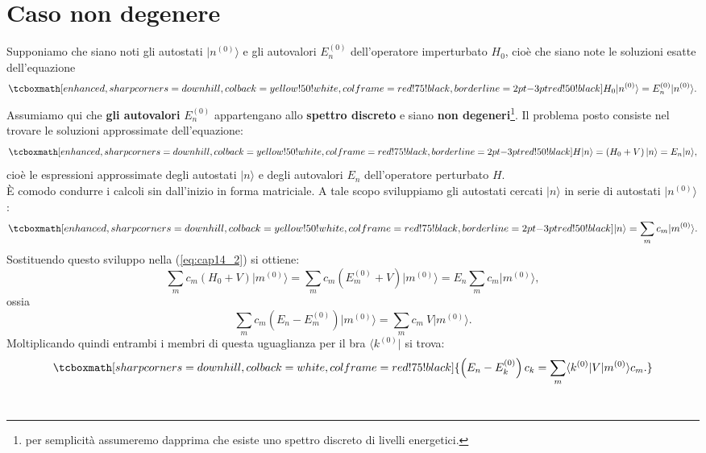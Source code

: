 \section{Caso non degenere}
Supponiamo che siano noti gli autostati $\vert n^{(0)} \rangle$ e gli autovalori $E_n ^{(0)}$ dell'operatore imperturbato $H_0$, cioè che siano note le soluzioni esatte dell'equazione
	\begin{equation}
		\tcboxmath[enhanced, sharp corners=downhill, colback=yellow!50!white, colframe=red!75!black, borderline={2pt}{-3pt}{red!50!black}]{
			H_0\vert n^{(0)} \rangle=E_n ^{(0)}\vert n^{(0)} \rangle.
			}
	\label{eq:cap14_1}
	\end{equation}
Assumiamo qui che \textbf{gli autovalori} $E_n ^{(0)}$ appartengano allo \textbf{spettro discreto} e siano \textbf{non degeneri}\footnote{per semplicità assumeremo dapprima che esiste uno spettro discreto di livelli energetici.}. Il problema posto consiste nel trovare le soluzioni approssimate dell'equazione:
	\begin{equation}
		\tcboxmath[enhanced, sharp corners=downhill, colback=yellow!50!white, colframe=red!75!black, borderline={2pt}{-3pt}{red!50!black}]{
			H\vert n \rangle=\left( H_0+ V \right) \vert n \rangle= E_n \vert n \rangle,
			}
	\label{eq:cap14_2}
	\end{equation}
cioè le espressioni approssimate degli autostati $\vert n \rangle$ e degli autovalori $E_n$ dell'operatore perturbato $H$.\\

È comodo condurre i calcoli sin dall'inizio in forma matriciale. A tale scopo sviluppiamo gli autostati cercati $\vert n \rangle$ in serie di autostati $\vert n^{(0)} \rangle$:
	\begin{equation}
		\tcboxmath[enhanced, sharp corners=downhill, colback=yellow!50!white, colframe=red!75!black, borderline={2pt}{-3pt}{red!50!black}]{
			\vert n \rangle= \sum _m c_m \vert m^{(0)} \rangle.
			}
	\label{eq:cap14_3}
	\end{equation}
Sostituendo questo sviluppo nella (\ref{eq:cap14_2}) si ottiene:
	\begin{equation}
		\sum _m c_m \left( H_0+V\right)\vert m^{(0)} \rangle =\sum _m c_m \left( E_m ^{(0)}+V\right)\vert m^{(0)} \rangle= E_n\sum _m c_m \vert m^{(0)} \rangle,
	\end{equation}
ossia
	\begin{equation}
		\sum _m c_m \left( E_n-E_m ^{(0)}\right)\vert m^{(0)}\rangle=\sum _m c_m\ V\vert m^{(0)}\rangle.
	\end{equation}
Moltiplicando quindi entrambi i membri di questa uguaglianza per il bra $\langle k^{(0)}\vert$ si trova:
	\begin{equation}
		\tcboxmath[sharp corners=downhill, colback=white, colframe=red!75!black]{
			\left( E_n-E_k ^{(0)}\right)c_k =\sum _m \langle k^{(0)}\vert V\vert m^{(0)}\rangle c_m.
			}
	\label{eq:cap14_4}
	\end{equation}\\
	
